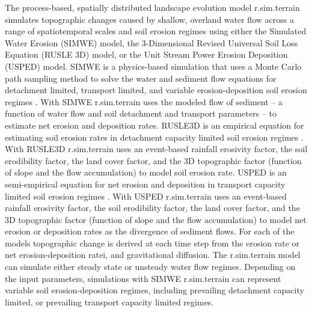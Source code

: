 \documentclass[gmd, manuscript]{copernicus}
\begin{document}
The process-based, spatially distributed 
landscape evolution model r.sim.terrain
simulates topographic changes
caused by shallow, overland water flow
across a range of spatiotemporal scales and soil erosion regimes
using either
the Simulated Water Erosion (SIMWE) model, 
the 3-Dimensional Revised Universal Soil Loss Equation (RUSLE 3D) model,
or the Unit Stream Power Erosion Deposition (USPED) model.  
SIMWE is a physics-based simulation
that uses a Monte Carlo path sampling method
to solve the water and sediment flow equations 
for detachment limited, transport limited, and variable erosion-deposition 
soil erosion regimes \citep{Mitas1998,Mitasova2004}. 
With SIMWE 
r.sim.terrain
uses the modeled flow of sediment 
-- a function of water flow and soil detachment and transport parameters -- 
to estimate net erosion and deposition rates. 
RUSLE3D is an empirical equation for estimating soil erosion rates
in detachment capacity limited soil erosion regimes \citep{Mitasova1996,Mitasova2013}. 
With RUSLE3D
r.sim.terrain
uses an event-based rainfall erosivity factor, 
the soil erodibility factor, the land cover factor, and the 3D topographic factor (function of slope and the flow accumulation)
to model soil erosion rate.
USPED is an semi-empirical equation for net erosion and deposition 
in transport capacity limited soil erosion regimes \citep{Mitasova1996,Mitasova2013}. 
With USPED 
r.sim.terrain
uses an event-based rainfall erosivity factor, 
the soil erodibility factor, the land cover factor, and the 3D topographic factor (function of slope and the flow accumulation)
to model net erosion or deposition rates as the divergence of sediment flows. 
For each of the models topographic change is derived at each time step
from the erosion rate or
net erosion-deposition ratei, and gravitational diffusion.
The r.sim.terrain model
can simulate either steady state or unsteady water flow regimes.
Depending on the input parameters, simulations with SIMWE 
r.sim.terrain
can represent variable soil erosion-deposition regimes, including prevailing  
detachment capacity limited, or prevailing transport capacity limited regimes.
\end{document}

